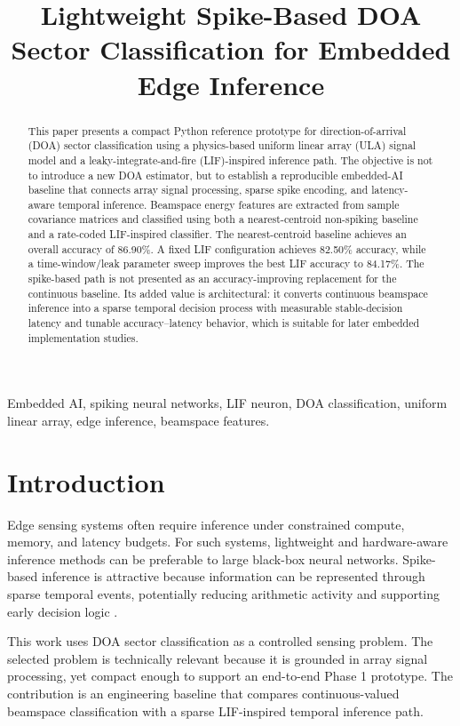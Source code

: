 \documentclass[conference]{IEEEtran}
\title{Lightweight Spike-Based DOA Sector Classification for Embedded Edge Inference}
\author{\IEEEauthorblockN{Hossein Molhem}
\IEEEauthorblockA{Department of Electrical and Computer Engineering\\
Kennesaw State University\\
Email: hmolhem@students.kennesaw.edu}}
\begin{document}
\maketitle

\begin{abstract}
This paper presents a compact Python reference prototype for direction-of-arrival (DOA) sector classification using a physics-based uniform linear array (ULA) signal model and a leaky-integrate-and-fire (LIF)-inspired inference path. The objective is not to introduce a new DOA estimator, but to establish a reproducible embedded-AI baseline that connects array signal processing, sparse spike encoding, and latency-aware temporal inference. Beamspace energy features are extracted from sample covariance matrices and classified using both a nearest-centroid non-spiking baseline and a rate-coded LIF-inspired classifier. The nearest-centroid baseline achieves an overall accuracy of 86.90\%. A fixed LIF configuration achieves 82.50\% accuracy, while a time-window/leak parameter sweep improves the best LIF accuracy to 84.17\%. The spike-based path is not presented as an accuracy-improving replacement for the continuous baseline. Its added value is architectural: it converts continuous beamspace inference into a sparse temporal decision process with measurable stable-decision latency and tunable accuracy--latency behavior, which is suitable for later embedded implementation studies.
\end{abstract}

\begin{IEEEkeywords}
Embedded AI, spiking neural networks, LIF neuron, DOA classification, uniform linear array, edge inference, beamspace features.
\end{IEEEkeywords}

\section{Introduction}

Edge sensing systems often require inference under constrained compute, memory, and latency budgets. For such systems, lightweight and hardware-aware inference methods can be preferable to large black-box neural networks. Spike-based inference is attractive because information can be represented through sparse temporal events, potentially reducing arithmetic activity and supporting early decision logic \cite{maass,roy}.

This work uses DOA sector classification as a controlled sensing problem. The selected problem is technically relevant because it is grounded in array signal processing, yet compact enough to support an end-to-end Phase 1 prototype. The contribution is an engineering baseline that compares continuous-valued beamspace classification with a sparse LIF-inspired temporal inference path.
\end{document}

